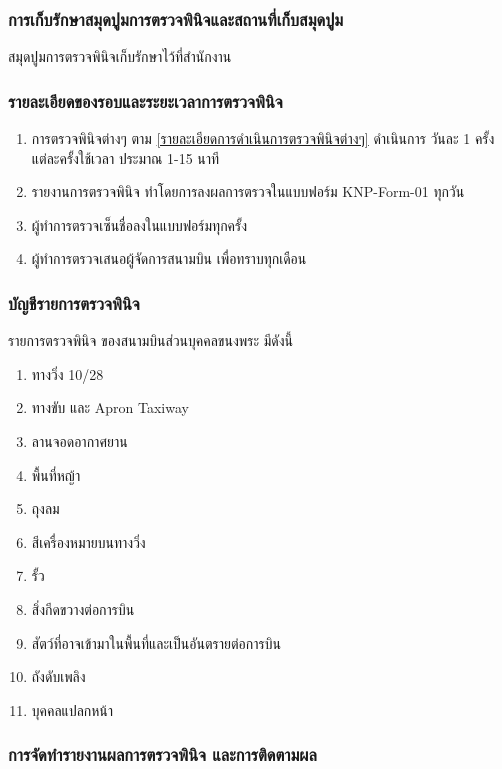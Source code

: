 \subsubsection{การเก็บรักษาสมุดปูมการตรวจพินิจและสถานที่เก็บสมุดปูม}

สมุดปูมการตรวจพินิจเก็บรักษาไว้ที่สำนักงาน

\subsubsection{รายละเอียดของรอบและระยะเวลาการตรวจพินิจ}

\begin{enumerate}
\item การตรวจพินิจต่างๆ ตาม \ref{รายละเอียดการดำเนินการตรวจพินิจต่างๆ} ดำเนินการ วันละ 1 ครั้ง แต่ละครั้งใช้เวลา ประมาณ 1-15 นาที
\item รายงานการตรวจพินิจ ทำโดยการลงผลการตรวจในแบบฟอร์ม KNP-Form-01  ทุกวัน
\item ผู้ทำการตรวจเซ็นชื่อลงในแบบฟอร์มทุกครั้ง
\item ผู้ทำการตรวจเสนอผู้จัดการสนามบิน เพื่อทราบทุกเดือน
\end{enumerate}

\subsubsection{บัญชีรายการตรวจพินิจ}

รายการตรวจพินิจ ของสนามบินส่วนบุคคลขนงพระ มีดังนี้

\begin{enumerate}
\item ทางวิ่ง 10/28
\item ทางขับ และ Apron Taxiway 
\item ลานจอดอากาศยาน
\item พื้นที่หญ้า
\item ถุงลม
\item สีเครื่องหมายบนทางวิ่ง
\item รั้ว
\item สิ่งกีดขวางต่อการบิน
\item สัตว์ที่อาจเข้ามาในพื้นที่และเป็นอันตรายต่อการบิน
\item ถังดับเพลิง
\item บุคคลแปลกหน้า
\end{enumerate}

\subsubsection{การจัดทำรายงานผลการตรวจพินิจ และการติดตามผล}

